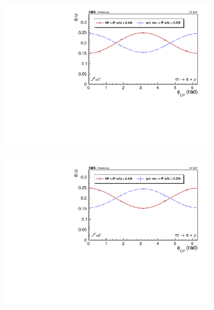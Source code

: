 \begin{figure}[!ht]
  \begin{subfigure}[b]{0.5\linewidth}
    \centering
    \includegraphics[width=\linewidth]{Chapitre6/Images/RHOPION/RHOPION_even_reco.pdf} 
    \caption*{} 
    \vspace{0.5ex}
  \end{subfigure}%
  \begin{subfigure}[b]{0.5\linewidth}
    \centering
    \includegraphics[width=\linewidth]{Chapitre6/Images/RHOPION/RHOPION_odd_reco.pdf} 
    \caption*{} 
    \vspace{0.5ex}
  \end{subfigure} 


\end{figure}
